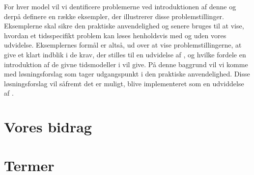 For hver model vil vi dentificere problemerne ved introduktionen af denne og derpå definere en række eksempler, der illustrerer disse problemstillinger. Eksemplerne skal sikre den praktiske anvendelighed og senere bruges til at vise, hvordan et tidsspecifikt problem kan løses henholdsvis med og uden vores udvidelse. Eksemplernes formål er altså, ud over at vise problemstillingerne, at give et klart indblik i de krav, der stilles til en udvidelse af \pycsp, og hvilke fordele en introduktion af de givne tidsmodeller i \pycsp vil give. På denne baggrund vil vi komme med løsningsforslag som tager udgangspunkt i den praktiske anvendelighed. Disse løsningsforslag vil såfremt det er muligt, blive implementeret som en udviddelse af \pycsp.



\section{Vores bidrag}
\section{Termer}

